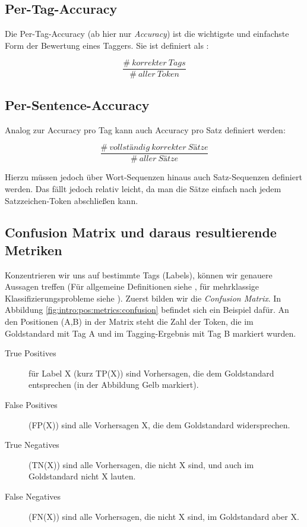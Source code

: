 \subsection{Per-Tag-Accuracy}

Die Per-Tag-Accuracy (ab hier nur \textit{Accuracy}) ist die wichtigste und einfachste Form der Bewertung eines Taggers. Sie ist definiert als \cite{Rao} :

\[ \frac{\# \: korrekter \:  Tags}{\# \: aller \:  Token} \]

\subsection{Per-Sentence-Accuracy}

Analog zur Accuracy pro Tag kann auch Accuracy pro Satz definiert werden:

\[ \frac{\# \: vollständig \: korrekter \:  Sätze}{\# \: aller \:  Sätze} \]

Hierzu müssen jedoch über Wort-Sequenzen hinaus auch Satz-Sequenzen definiert werden. Das fällt jedoch relativ leicht, da man die Sätze einfach nach jedem Satzzeichen-Token abschließen kann.

\subsection{Confusion Matrix und daraus resultierende Metriken}
Konzentrieren wir uns auf bestimmte Tags (Labels), können wir genauere Aussagen treffen
(Für allgemeine Definitionen siehe \cite{Rao}, für mehrklassige Klassifizierungsprobleme siehe \cite{Web:rxnlp}). Zuerst bilden wir die \textit{Confusion Matrix}. In Abbildung \ref{fig:intro:pos:metrics:confusion} befindet sich ein Beispiel dafür. An den Positionen (A,B) in der Matrix steht die Zahl der Token, die im Goldstandard mit Tag A und im Tagging-Ergebnis mit Tag B markiert wurden.
\begin{description}

\item[True Positives] für Label X (kurz TP(X)) sind Vorhersagen, die dem Goldstandard entsprechen (in der Abbildung Gelb markiert).
\item[False Positives] (FP(X)) sind alle Vorhersagen X, die dem Goldstandard widersprechen.
\item[True Negatives] (TN(X)) sind alle Vorhersagen, die nicht X sind, und auch im Goldstandard nicht X lauten.
\item[False Negatives] (FN(X)) sind alle Vorhersagen, die nicht X sind, im Goldstandard aber X.
\end{description}

